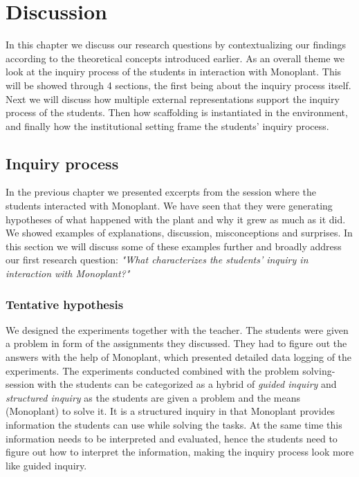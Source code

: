 \chapter{Discussion}
In this chapter we discuss our research questions by contextualizing our findings according to the theoretical concepts introduced earlier. As an overall theme we look at the inquiry process of the students in interaction with Monoplant. This will be showed through 4 sections, the first being about the inquiry process itself. Next we will discuss how multiple external representations support the inquiry process of the students. Then how scaffolding is instantiated in the environment, and finally how the institutional setting frame the students' inquiry process.


\section{Inquiry process}
In the previous chapter we presented excerpts from the session where the students interacted with Monoplant. We have seen that they were generating hypotheses of what happened with the plant and why it grew as much as it did. We showed examples of explanations, discussion, misconceptions and surprises. In this section we will discuss some of these examples further and broadly address our first research question: \emph{"What characterizes the students’ inquiry in interaction with Monoplant?"}

\subsection{Tentative hypothesis}
We designed the experiments together with the teacher. The students were given a problem in form of the assignments they discussed. They had to figure out the answers with the help of Monoplant, which presented detailed data logging of the experiments. The experiments conducted combined with the problem solving-session with the students can be categorized as a hybrid of \emph{guided inquiry} and \emph{structured inquiry} \citetext{\citet{staver1987analysis}, referenced in \citealp{prince2006inductive}} as the students are given a problem and the means (Monoplant) to solve it. It is a structured inquiry in that Monoplant provides information  the students can use while solving the tasks. At the same time this information needs to be interpreted and evaluated, hence the students need to figure out how to interpret the information, making the inquiry process look more like guided inquiry.

